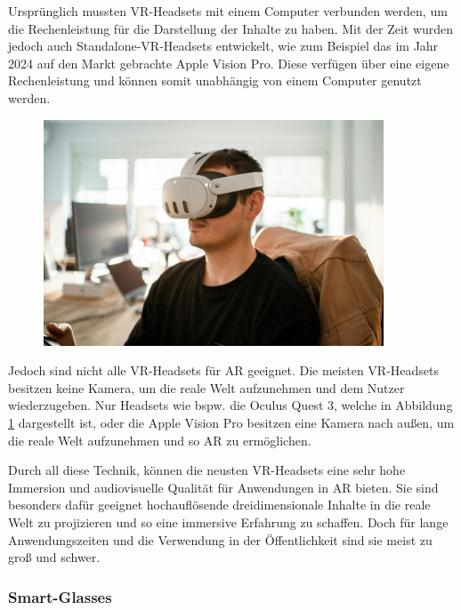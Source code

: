     Ursprünglich mussten VR-Headsets mit einem Computer verbunden werden, um die Rechenleistung für die Darstellung der Inhalte zu haben.
    Mit der Zeit wurden jedoch auch Standalone-VR-Headsets entwickelt, wie zum Beispiel das im Jahr 2024 auf den Markt gebrachte Apple Vision Pro.
    Diese verfügen über eine eigene Rechenleistung und können somit unabhängig von einem Computer genutzt werden.

    \begin{figure}[H]
      \centering
      \includegraphics[width=0.9\textwidth]{images/quest3_example.jpg}
      \label{fig:oculus-quest-3}
    \end{figure}

    Jedoch sind nicht alle VR-Headsets für AR geeignet.
    Die meisten VR-Headsets besitzen keine Kamera, um die reale Welt aufzunehmen und dem Nutzer wiederzugeben.
    Nur Headsets wie bspw. die Oculus Quest 3, welche in Abbildung \ref{fig:oculus-quest-3} dargestellt ist, oder die Apple Vision Pro besitzen eine Kamera nach außen, um die reale Welt aufzunehmen und so AR zu ermöglichen.
    
    Durch all diese Technik, können die neusten VR-Headsets eine sehr hohe Immersion und audiovisuelle Qualität für Anwendungen in AR bieten.
    Sie sind besonders dafür geeignet hochauflösende dreidimensionale Inhalte in die reale Welt zu projizieren und so eine immersive Erfahrung zu schaffen.
    Doch für lange Anwendungszeiten und die Verwendung in der Öffentlichkeit sind sie meist zu groß und schwer.

   

    \subsubsection{Smart-Glasses}

